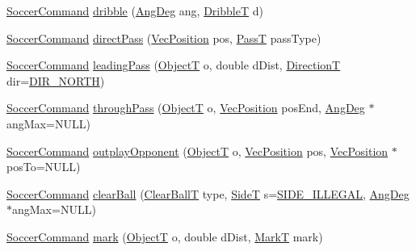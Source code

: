 \begin{DoxyCompactItemize}
\hyperlink{classSoccerCommand}{Soccer\+Command} \hyperlink{classBasicPlayer_a63e33779fbadff1b61a499c4176ac6f4}{dribble} (\hyperlink{Geometry_8h_a6bfe02ae9bb185092902092561ab2865}{Ang\+Deg} ang, \hyperlink{SoccerTypes_8h_a0ccbf575eb8292e31644ccf3e84e3e3b}{DribbleT} d)
\item 
\hyperlink{classSoccerCommand}{Soccer\+Command} \hyperlink{classBasicPlayer_a687cc07033c6546931971f570c1e3a67}{direct\+Pass} (\hyperlink{classVecPosition}{Vec\+Position} pos, \hyperlink{SoccerTypes_8h_ab93ab6e2460fd3f4ae01757ea619ee30}{PassT} pass\+Type)
\item 
\hyperlink{classSoccerCommand}{Soccer\+Command} \hyperlink{classBasicPlayer_a9c6793780826b51a126102c5d29707ea}{leading\+Pass} (\hyperlink{SoccerTypes_8h_ad4b701fa66e7d26c054ed15b7820c77c}{ObjectT} o, double d\+Dist, \hyperlink{SoccerTypes_8h_a8e832a4ec6c67d3151112ed1e1c67752}{DirectionT} dir=\hyperlink{SoccerTypes_8h_a8e832a4ec6c67d3151112ed1e1c67752a944af66843e2c071955de8dfc4e7f407}{D\+I\+R\+\_\+\+N\+O\+R\+TH})
\item 
\hyperlink{classSoccerCommand}{Soccer\+Command} \hyperlink{classBasicPlayer_aca8ea920641ef60220f1ff9ce4975268}{through\+Pass} (\hyperlink{SoccerTypes_8h_ad4b701fa66e7d26c054ed15b7820c77c}{ObjectT} o, \hyperlink{classVecPosition}{Vec\+Position} pos\+End, \hyperlink{Geometry_8h_a6bfe02ae9bb185092902092561ab2865}{Ang\+Deg} $\ast$ang\+Max=N\+U\+LL)
\item 
\hyperlink{classSoccerCommand}{Soccer\+Command} \hyperlink{classBasicPlayer_ae16c69a2f51d2eafd1e01ae6664059fe}{outplay\+Opponent} (\hyperlink{SoccerTypes_8h_ad4b701fa66e7d26c054ed15b7820c77c}{ObjectT} o, \hyperlink{classVecPosition}{Vec\+Position} pos, \hyperlink{classVecPosition}{Vec\+Position} $\ast$pos\+To=N\+U\+LL)
\item 
\hyperlink{classSoccerCommand}{Soccer\+Command} \hyperlink{classBasicPlayer_a06f048f249f2180bf287932724660a63}{clear\+Ball} (\hyperlink{SoccerTypes_8h_ae2955c91fd80f27b4c28cfd55a517e77}{Clear\+BallT} type, \hyperlink{SoccerTypes_8h_a8e9b8119c00121a197203aca01d5b090}{SideT} s=\hyperlink{SoccerTypes_8h_a8e9b8119c00121a197203aca01d5b090a15a5449d2724d5cf4a7855b32888b24a}{S\+I\+D\+E\+\_\+\+I\+L\+L\+E\+G\+AL}, \hyperlink{Geometry_8h_a6bfe02ae9bb185092902092561ab2865}{Ang\+Deg} $\ast$ang\+Max=N\+U\+LL)
\item 
\hyperlink{classSoccerCommand}{Soccer\+Command} \hyperlink{classBasicPlayer_ac5217a00d71206eaf17bf3656bd6f995}{mark} (\hyperlink{SoccerTypes_8h_ad4b701fa66e7d26c054ed15b7820c77c}{ObjectT} o, double d\+Dist, \hyperlink{SoccerTypes_8h_a4cc7adc5fa3df60a8143bd51fc421f92}{MarkT} mark)

\end{DoxyCompactItemize}
